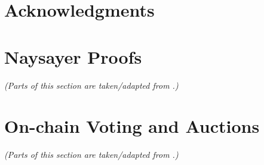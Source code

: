 \documentclass{article}
\renewcommand*{\backrefalt}[4]{}
\begin{document}
\newpage
\section*{Acknowledgments}

\newpage %


\renewcommand*{\backrefalt}[4]{\scriptsize%
    \ifcase #1%
          \or \textit{[p.~#2]}%
          \else \textit{[pp.~#2]}%
    \fi%
}

\newpage %
\tableofcontents

\newpage %




\section{Naysayer Proofs}\label{sec:naysayer}
\textit{(Parts of this section are taken/adapted from \cite{FC:SerGlaBon24}.)}








\section{On-chain Voting and Auctions}
\textit{(Parts of this section are taken/adapted from \cite{CTB:GSZB23}.)}











\end{document}
